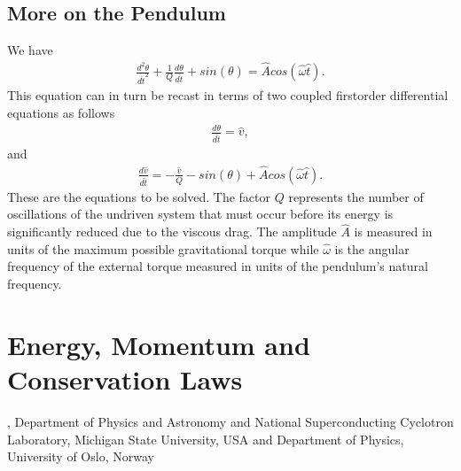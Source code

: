 \documentclass[letterpaper,10pt,english]{sphinxmanual}
\begin{document}
\subsection{More on the Pendulum}
\label{\detokenize{chapter2:id5}}
We have
\begin{equation*}
\begin{split}
\frac{d^2\theta}{d\hat{t}^2}+\frac{1}{Q}\frac{d\theta}{d\hat{t}}  
     +sin(\theta)=\hat{A}cos(\hat{\omega}\hat{t}).
\end{split}
\end{equation*}
This equation can in turn be recast in terms of two coupled first\sphinxhyphen{}order differential equations as follows
\begin{equation*}
\begin{split}
\frac{d\theta}{d\hat{t}}=\hat{v},
\end{split}
\end{equation*}
and
\begin{equation*}
\begin{split}
\frac{d\hat{v}}{d\hat{t}}=-\frac{\hat{v}}{Q}-sin(\theta)+\hat{A}cos(\hat{\omega}\hat{t}).
\end{split}
\end{equation*}
These are the equations to be solved.  The factor \(Q\) represents the number of oscillations of the undriven system that must occur before  its energy is significantly reduced due to the viscous drag. The  amplitude \(\hat{A}\) is measured in units of the maximum possible  gravitational torque while \(\hat{\omega}\) is the angular frequency of the external torque measured in units of the pendulum’s natural frequency.




\section{Energy, Momentum and Conservation Laws}
\label{\detokenize{chapter3:energy-momentum-and-conservation-laws}}\label{\detokenize{chapter3::doc}}




, Department of Physics and Astronomy and National Superconducting Cyclotron Laboratory, Michigan State University, USA and Department of Physics, University of Oslo, Norway
\end{document}
